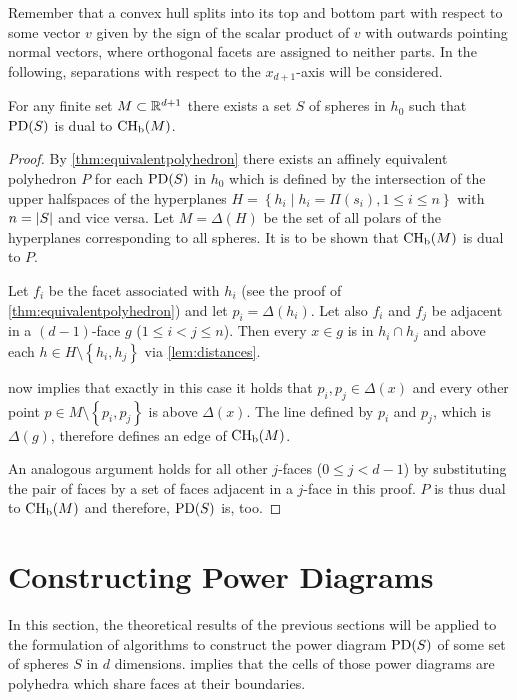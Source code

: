 Remember that a convex hull splits into its top and bottom part with respect to some vector $v$ given by the sign of the scalar product of $v$ with outwards pointing normal vectors, where orthogonal facets are assigned to neither parts.
In the following, separations with respect to the $x_{d+1}$-axis will be considered.
\begin{theorem}
    \label{thm:equivalentconvexhull}
    For any finite set $M \subset \mathbb{R}^{d+1}$ there exists a set $S$ of spheres in $h_0$ such that $\operatorname{PD}(S)$ is dual to $\operatorname{CH_b}(M)$.
\end{theorem}
\begin{proof}
    By \cref{thm:equivalentpolyhedron} there exists an affinely equivalent polyhedron $P$ for each $\operatorname{PD}(S)$ in $h_0$ which is defined by the intersection of the upper halfspaces of the hyperplanes $H = \left\{ h_i \mid h_i = \Pi(s_i), 1 \leq i \leq n \right\}$ with $n = \left\vert S \right\vert$ and vice versa.
    Let $M = \Delta(H)$ be the set of all polars of the hyperplanes corresponding to all spheres.
    It is to be shown that $\operatorname{CH_b}(M)$ is dual to $P$.

    Let $f_i$ be the facet associated with $h_i$ (see the proof of \cref{thm:equivalentpolyhedron}) and let $p_i = \Delta(h_i)$.
    Let also $f_i$ and $f_j$ be adjacent in a $(d-1)$-face $g$ ($1 \leq i < j \leq n$).
    Then every $x \in g$ is in $h_i \cap h_j$ and above each $h \in H \setminus \left\{ h_i, h_j \right\}$ via \cref{lem:distances}.

     now implies that exactly in this case it holds that $p_i, p_j \in \Delta(x)$ and every other point $p \in M \setminus \left\{ p_i, p_j \right\}$ is above $\Delta(x)$.
    The line defined by $p_i$ and $p_j$, which is $\Delta(g)$, therefore defines an edge of $\operatorname{CH_b}(M)$.

    An analogous argument holds for all other $j$-faces ($0 \leq j < d-1$) by substituting the pair of faces by a set of faces adjacent in a $j$-face in this proof.
    $P$ is thus dual to $\operatorname{CH_b}(M)$ and therefore, $\operatorname{PD}(S)$ is, too.
\end{proof}

\section{Constructing Power Diagrams}
\label{sec:constructing_power_diagrams}
In this section, the theoretical results of the previous sections will be applied to the formulation of algorithms to construct the power diagram $\operatorname{PD}(S)$ of some set of spheres $S$ in $d$ dimensions.
 implies that the cells of those power diagrams are polyhedra which share faces at their boundaries.


